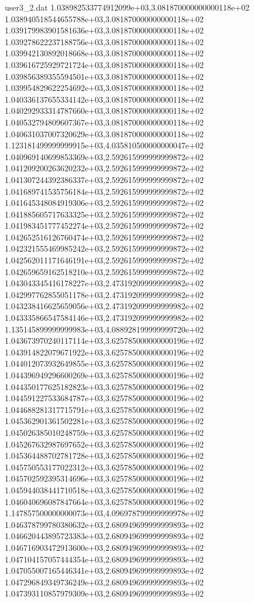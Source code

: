 \begin{filecontents}{user3_2.dat}
1.038982533774912099e+03,3.081870000000000118e+02
1.038940518544655788e+03,3.081870000000000118e+02
1.039179983901581636e+03,3.081870000000000118e+02
1.039278622237188756e+03,3.081870000000000118e+02
1.039942130892018668e+03,3.081870000000000118e+02
1.039616725929721724e+03,3.081870000000000118e+02
1.039856389355594501e+03,3.081870000000000118e+02
1.039954829622254692e+03,3.081870000000000118e+02
1.040336137655334142e+03,3.081870000000000118e+02
1.040292933314787660e+03,3.081870000000000118e+02
1.040532794809607367e+03,3.081870000000000118e+02
1.040631037007320629e+03,3.081870000000000118e+02
1.123181499999999915e+03,4.035810500000000047e+02
1.040969140699853369e+03,2.592615999999999872e+02
1.041209200263620232e+03,2.592615999999999872e+02
1.041307244392386337e+03,2.592615999999999872e+02
1.041689741535756184e+03,2.592615999999999872e+02
1.041645348084919306e+03,2.592615999999999872e+02
1.041885605717633325e+03,2.592615999999999872e+02
1.041983451777452274e+03,2.592615999999999872e+02
1.042652516126760474e+03,2.592615999999999872e+02
1.042321555469985242e+03,2.592615999999999872e+02
1.042562011171646191e+03,2.592615999999999872e+02
1.042659659162518210e+03,2.592615999999999872e+02
1.043043345416178227e+03,2.473192099999999982e+02
1.042997762855051178e+03,2.473192099999999982e+02
1.043238416625659056e+03,2.473192099999999982e+02
1.043335866547584146e+03,2.473192099999999982e+02
1.135145899999999983e+03,4.088928199999999720e+02
1.043673970240117114e+03,3.625785000000000196e+02
1.043914822079671922e+03,3.625785000000000196e+02
1.044012073932649855e+03,3.625785000000000196e+02
1.044396949296600269e+03,3.625785000000000196e+02
1.044350177625182823e+03,3.625785000000000196e+02
1.044591227533684787e+03,3.625785000000000196e+02
1.044688281317715791e+03,3.625785000000000196e+02
1.045362901361502281e+03,3.625785000000000196e+02
1.045026385010248759e+03,3.625785000000000196e+02
1.045267632987697652e+03,3.625785000000000196e+02
1.045364488702781728e+03,3.625785000000000196e+02
1.045750553177022312e+03,3.625785000000000196e+02
1.045702592395314696e+03,3.625785000000000196e+02
1.045944038441710518e+03,3.625785000000000196e+02
1.046040696087847664e+03,3.625785000000000196e+02
1.147857500000000073e+03,4.096978799999999978e+02
1.046378799780380632e+03,2.680949699999999893e+02
1.046620443895723383e+03,2.680949699999999893e+02
1.046716903472913600e+03,2.680949699999999893e+02
1.047104157057444354e+03,2.680949699999999893e+02
1.047055007165446341e+03,2.680949699999999893e+02
1.047296849349736249e+03,2.680949699999999893e+02
1.047393110857979309e+03,2.680949699999999893e+02

\end{filecontents}
